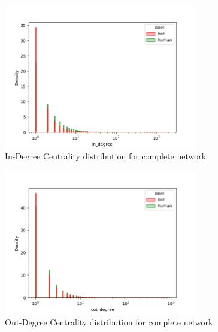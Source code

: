 \documentclass[12pt, a4paper]{article}
\begin{document}
\begin{itemize}
                \begin{figure}[H]
                    \centering
                    \includegraphics[width=0.75\textwidth]{results/complete_in_degree.png}
                    \caption{In-Degree Centrality distribution for complete network}
                \end{figure}
                \begin{figure}[H]
                    \centering
                    \includegraphics[width=0.75\textwidth]{results/complete_out_degree.png}
                    \caption{Out-Degree Centrality distribution for complete network}
                \end{figure}
				\begin{figure}[H]
    				\centering
    				\begin{minipage}[b]{0.49\textwidth}    				
        				\centering
        				\setlength{\fboxsep}{0pt}
    					\setlength{\fboxrule}{0.5pt}

\end{minipage}
\end{figure}
\end{itemize}
\end{document}
